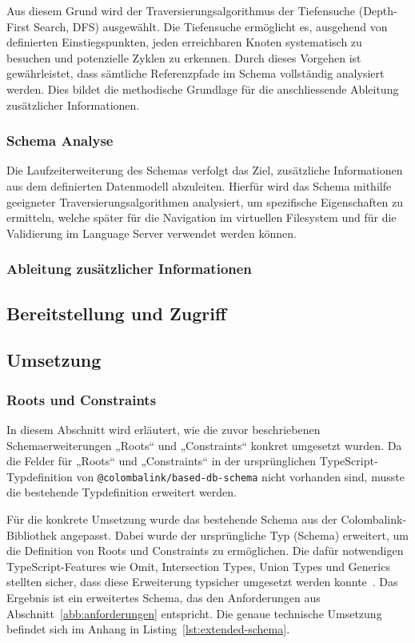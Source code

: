 Aus diesem Grund wird der Traversierungsalgorithmus der Tiefensuche (Depth-First Search, DFS) ausgewählt. Die Tiefensuche ermöglicht es, ausgehend von definierten Einstiegspunkten, jeden erreichbaren Knoten systematisch zu besuchen und potenzielle Zyklen zu erkennen. Durch dieses Vorgehen ist gewährleistet, dass sämtliche Referenzpfade im Schema vollständig analysiert werden. Dies bildet die methodische Grundlage für die anschliessende Ableitung zusätzlicher Informationen.








\subsubsection{Schema Analyse}
Die Laufzeiterweiterung des Schemas verfolgt das Ziel, zusätzliche Informationen aus dem definierten Datenmodell abzuleiten. Hierfür wird das Schema mithilfe geeigneter Traversierungsalgorithmen analysiert, um spezifische Eigenschaften zu ermitteln, welche später für die Navigation im virtuellen Filesystem und für die Validierung im Language Server verwendet werden können.


\subsubsection{Ableitung zusätzlicher Informationen}

\subsection{Bereitstellung und Zugriff}



\subsection{Umsetzung}
\subsubsection{Roots und Constraints}
In diesem Abschnitt wird erläutert, wie die zuvor beschriebenen Schemaerweiterungen „Roots“ und „Constraints“ konkret umgesetzt wurden. Da die Felder für „Roots“ und „Constraints“ in der ursprünglichen TypeScript-Typdefinition von \texttt{@colombalink/based-db-schema} nicht vorhanden sind, musste die bestehende Typdefinition erweitert werden.


Für die konkrete Umsetzung wurde das bestehende Schema aus der Colombalink-Bibliothek angepasst. Dabei wurde der ursprüngliche Typ (Schema) erweitert, um die Definition von Roots und Constraints zu ermöglichen. Die dafür notwendigen TypeScript-Features wie Omit, Intersection Types, Union Types und Generics stellten sicher, dass diese Erweiterung typsicher umgesetzt werden konnte~\cite{typescript:handbook}. Das Ergebnis ist ein erweitertes Schema, das den Anforderungen aus Abschnitt~\ref{abb:anforderungen} entspricht. Die genaue technische Umsetzung befindet sich im Anhang in Listing~\ref{lst:extended-schema}.

